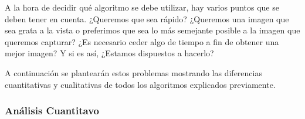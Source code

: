 A la hora de decidir qué algoritmo se debe utilizar, hay varios puntos que se deben tener en cuenta. ¿Queremos que sea rápido? ¿Queremos una imagen que sea grata a la vista o preferimos que sea lo más semejante posible a la imagen que queremos capturar? ¿Es necesario ceder algo de tiempo a fin de obtener una mejor imagen? Y si es así, ¿Estamos dispuestos a hacerlo? 

\vspace{\baselineskip}

A continuación se plantearán estos problemas mostrando las diferencias cuantitativas y cualitativas de todos los algoritmos explicados previamente.

\subsubsection{Análisis Cuantitavo}

